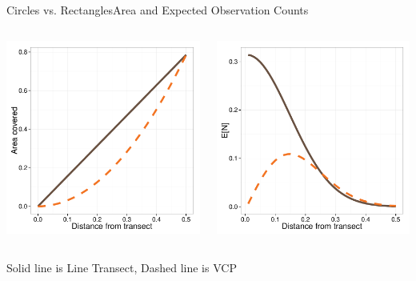 \documentclass{beamer}
\begin{document}
\begin{frame}{Circles vs. Rectangles}{Area and Expected Observation Counts}
	\begin{columns}
		\begin{column}{0.48\textwidth}
		\includegraphics[width=\textwidth]{../images/rect-circ-area.pdf}
		\end{column}
		\begin{column}{0.48\textwidth}
		\includegraphics[width=\textwidth]{../images/rect-circ-detection.pdf}
		\end{column}
	\end{columns}
	\begin{center}
	\par Solid line is Line Transect, Dashed line is VCP
	\end{center}
	
\end{frame}
\end{document}
